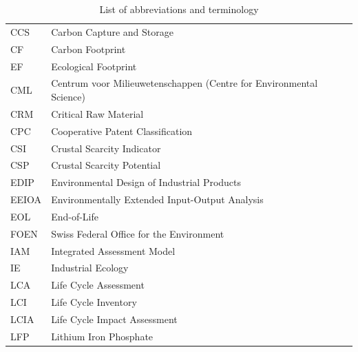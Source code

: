 \documentclass[a4paper,fleqn]{cas-dc}
\begin{document}
\begin{table}
	\centering
	\caption*{List of abbreviations and terminology}\label{tab:abbreviations}
	\begin{tabular}{ll}
		\toprule
		CCS	              & Carbon Capture and Storage                                          \\
		CF                & Carbon Footprint                                                    \\
		EF                & Ecological Footprint                                                \\
		CML               & Centrum voor Milieuwetenschappen (Centre for Environmental Science) \\
		CRM               & Critical Raw Material                                               \\
		CPC               & Cooperative Patent Classification                                   \\
		CSI               & Crustal Scarcity Indicator                                          \\
		CSP               & Crustal Scarcity Potential                                          \\
		EDIP              & Environmental Design of Industrial Products                         \\
		EEIOA             & Environmentally Extended Input-Output Analysis                      \\
		EOL               & End-of-Life                                                         \\
		FOEN              & Swiss Federal Office for the Environment                            \\
		IAM               & Integrated Assessment Model                                         \\
		IE                & Industrial Ecology                                                  \\
		LCA               & Life Cycle Assessment                                               \\
		LCI               & Life Cycle Inventory                                                \\
		LCIA              & Life Cycle Impact Assessment                                        \\
		LFP               & Lithium Iron Phosphate                                              \\

\end{tabular}
\end{table}
\end{document}
